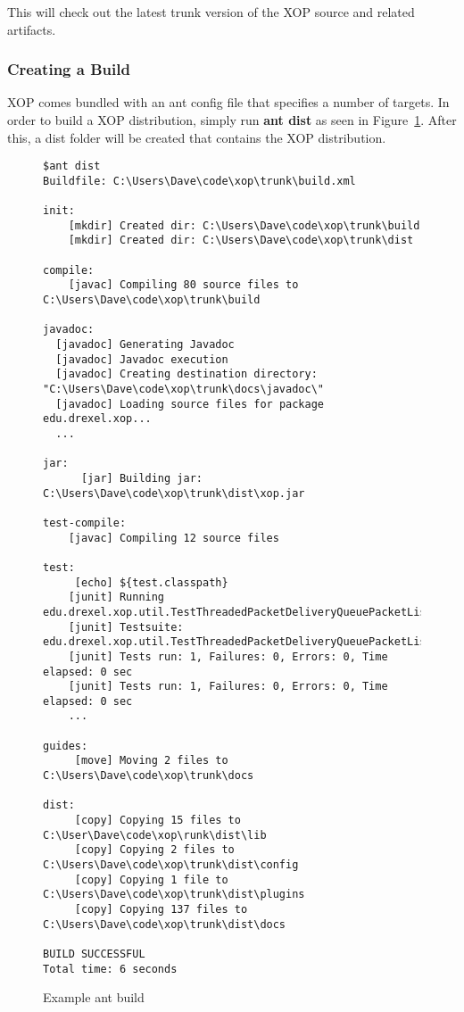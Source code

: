 \documentclass[draft]{article}
\begin{document}
This will check out the latest trunk version of the XOP source and related
artifacts.


\subsubsection{Creating a Build}
XOP comes bundled with an ant config file that specifies a number of targets.
In order to build a XOP distribution, simply run \textbf{ant dist} as seen
in Figure~\ref{fig:ant-build}. After this, a dist folder will be created
that contains the XOP distribution.

\begin{figure}
\begin{verbatim}
$ant dist
Buildfile: C:\Users\Dave\code\xop\trunk\build.xml

init:
    [mkdir] Created dir: C:\Users\Dave\code\xop\trunk\build
    [mkdir] Created dir: C:\Users\Dave\code\xop\trunk\dist

compile:
    [javac] Compiling 80 source files to C:\Users\Dave\code\xop\trunk\build

javadoc:
  [javadoc] Generating Javadoc
  [javadoc] Javadoc execution
  [javadoc] Creating destination directory: "C:\Users\Dave\code\xop\trunk\docs\javadoc\"
  [javadoc] Loading source files for package edu.drexel.xop...
  ...

jar:
      [jar] Building jar: C:\Users\Dave\code\xop\trunk\dist\xop.jar

test-compile:
    [javac] Compiling 12 source files

test:
     [echo] ${test.classpath}
    [junit] Running edu.drexel.xop.util.TestThreadedPacketDeliveryQueuePacketListener
    [junit] Testsuite: edu.drexel.xop.util.TestThreadedPacketDeliveryQueuePacketListener
    [junit] Tests run: 1, Failures: 0, Errors: 0, Time elapsed: 0 sec
    [junit] Tests run: 1, Failures: 0, Errors: 0, Time elapsed: 0 sec
    ...

guides:
     [move] Moving 2 files to C:\Users\Dave\code\xop\trunk\docs

dist:
     [copy] Copying 15 files to C:\User\Dave\code\xop\runk\dist\lib
     [copy] Copying 2 files to C:\Users\Dave\code\xop\trunk\dist\config
     [copy] Copying 1 file to C:\Users\Dave\code\xop\trunk\dist\plugins
     [copy] Copying 137 files to C:\Users\Dave\code\xop\trunk\dist\docs

BUILD SUCCESSFUL
Total time: 6 seconds
\end{verbatim}
\caption{Example ant build}
\label{fig:ant-build}
\end{figure}
\end{document}
